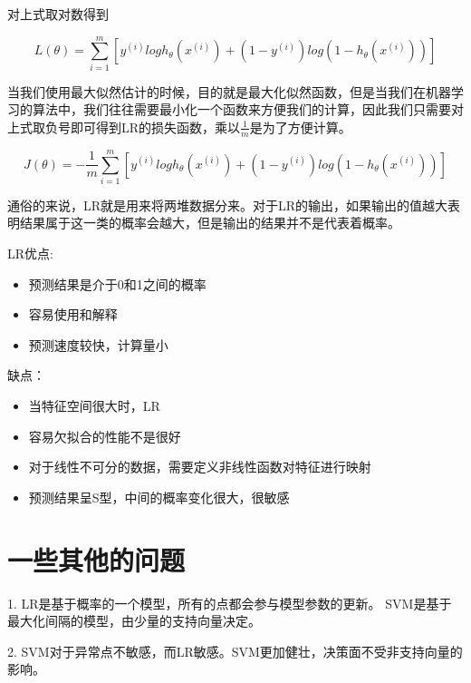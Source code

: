 	对上式取对数得到
	
	\begin{equation}
		L(\theta) = \sum_{i=1}^{m} \left[ y^{(i)} log h_\theta(x^{(i)})+ (1-y^{(i)})log(1-h_\theta(x^{(i)}))\right]
	
	\end{equation}
	
	当我们使用最大似然估计的时候，目的就是最大化似然函数，但是当我们在机器学习的算法中，我们往往需要最小化一个函数来方便我们的计算，因此我们只需要对上式取负号即可得到LR的损失函数，乘以$\frac{1}{m}$是为了方便计算。
	
	\begin{equation}
		J(\theta) = - \frac{1}{m} \sum_{i=1}^{m} \left[ y^{(i)} log h_\theta(x^{(i)})+ (1-y^{(i)})log(1-h_\theta(x^{(i)})) \right]	
	
	\end{equation}
	
	通俗的来说，LR就是用来将两堆数据分来。对于LR的输出，如果输出的值越大表明结果属于这一类的概率会越大，但是输出的结果并不是代表着概率。
	
	LR优点:
	
	\begin{itemize}
		\item 预测结果是介于0和1之间的概率
		\item 容易使用和解释
		\item 预测速度较快，计算量小
	\end{itemize}
	
	缺点：
	\begin{itemize}
		\item 当特征空间很大时，LR
		\item 容易欠拟合的性能不是很好
		\item 对于线性不可分的数据，需要定义非线性函数对特征进行映射
		\item 预测结果呈S型，中间的概率变化很大，很敏感
	\end{itemize}


\section{一些其他的问题}
	1. LR是基于概率的一个模型，所有的点都会参与模型参数的更新。
	   SVM是基于最大化间隔的模型，由少量的支持向量决定。
	   
	2. SVM对于异常点不敏感，而LR敏感。SVM更加健壮，决策面不受非支持向量的影响。
	
	










